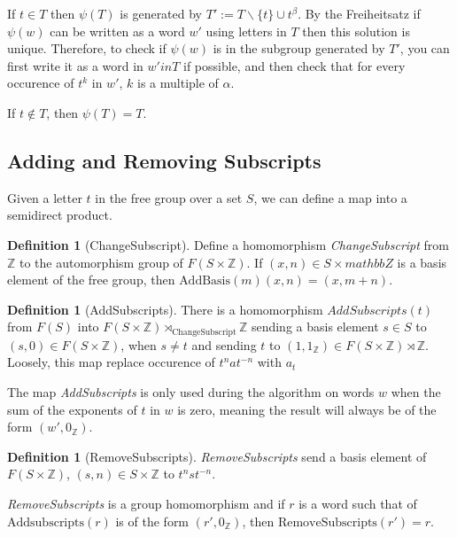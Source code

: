 \documentclass[11pt]{article} %
\theoremstyle{definition}
\theoremstyle{definition}
\theoremstyle{definition}
\theoremstyle{definition}
\theoremstyle{definition}
\newtheorem{defn}[theorem]{Definition}
\theoremstyle{definition}
\begin{document}
If $t \in T$ then $\psi(T)$ is generated by
$T' := T \backslash \{t\} \cup t^\beta$. By the Freiheitsatz if $\psi(w)$ can be written
as a word $w'$ using letters in $T$ then this solution is unique. Therefore,
to check if $\psi(w)$ is in the subgroup generated by $T'$, you can first
write it as a word in $w' in T$ if possible, and then check that for every
occurence of $t^k$ in $w'$, $k$ is a multiple of $\alpha$.

If $t \notin T$, then  $\psi(T) = T$.

\subsection{Adding and Removing Subscripts}

Given a letter $t$ in the free group over a set $S$, we can define a map into a
semidirect product.

\begin{defn}[ChangeSubscript]\label{csub}
  Define a homomorphism \textit{ChangeSubscript} from $\mathbb{Z}$ to the automorphism
  group of $F(S \times \mathbb{Z})$. If $(x, n) \in S \times mathbb{Z}$ is a basis
  element of the free group, then $\text{AddBasis}(m)(x, n) = (x, m + n)$.
\end{defn}

\begin{defn}[AddSubscripts]\label{AddSubscripts}
  There is a homomorphism $AddSubscripts(t)$ from $F(S)$ into $F(S \times \mathbb{Z})
  \rtimes_{\text{ChangeSubscript}} \mathbb{Z}$ sending a basis element $s \in S$ to
  $(s, 0) \in F(S \times \mathbb{Z})$, when $s \ne t$ and sending $t$ to
  $(1, 1_\mathbb{Z}) \in F(S \times \mathbb{Z}) \rtimes \mathbb{Z}$. Loosely, this map
  replace occurence of $t^n a t^{-n}$ with $a_t$
\end{defn}

The map \textit{AddSubscripts} is only used during the algorithm on words $w$ when the sum of the
exponents of $t$ in $w$ is zero, meaning the result will always be of the form
$(w', 0_{\mathbb{Z}})$.

\begin{defn}[RemoveSubscripts]
  \textit{RemoveSubscripts} send a basis element of $F(S\times \mathbb{Z})$,  $(s, n) \in S\times \mathbb{Z}$
  to $t^n s t^{-n}$.
\end{defn}
\textit{RemoveSubscripts} is a group homomorphism and if $r$ is a word such that
of $\text{Addsubscripts}(r)$ is of the form $(r', 0_\mathbb{Z})$,
then $\text{RemoveSubscripts}(r')=r$.
\end{document}
